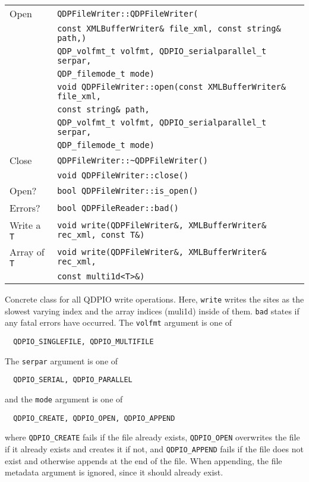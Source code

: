 \documentclass[12pt,letterpaper]{article}
\begin{document}
\begin{flushleft}
  \begin{tabular}{|l|l|}
  \hline
  Open           & \verb|QDPFileWriter::QDPFileWriter(|\\
                 & \qquad\verb|const XMLBufferWriter& file_xml, const string& path,)|\\
                 & \qquad\verb|QDP_volfmt_t volfmt, QDPIO_serialparallel_t serpar,|\\
		 & \qquad\verb|QDP_filemode_t mode)|\\

                 & \verb|void QDPFileWriter::open(const XMLBufferWriter& file_xml, |\\
                 & \qquad\verb|const string& path,|\\
                 & \qquad\verb|QDP_volfmt_t volfmt, QDPIO_serialparallel_t serpar,|\\
		 & \qquad\verb|QDP_filemode_t mode)|\\
  \hline
  Close          & \verb|QDPFileWriter::~QDPFileWriter()|\\
                 & \verb|void QDPFileWriter::close()|\\
  \hline
  Open?          & \verb|bool QDPFileWriter::is_open()| \\
  \hline
  Errors?        & \verb|bool QDPFileReader::bad()| \\
  \hline
  Write a \verb|T| & \verb|void write(QDPFileWriter&, XMLBufferWriter& rec_xml, const T&)| \\
  Array of \verb|T| & \verb|void write(QDPFileWriter&, XMLBufferWriter& rec_xml, |\\
                 & \qquad\verb|const multi1d<T>&)| \\
  \hline
 \end{tabular}
\end{flushleft}
%
Concrete class for all QDPIO write operations. Here, \verb|write|
writes the sites as the slowest varying index and the array indices
(muli1d) inside of them. \verb|bad| states if any fatal errors have
occurred. The \verb|volfmt| argument is one of
%
\begin{verbatim}
  QDPIO_SINGLEFILE, QDPIO_MULTIFILE
\end{verbatim}
%
The \verb|serpar| argument is one of
%
\begin{verbatim}
  QDPIO_SERIAL, QDPIO_PARALLEL
\end{verbatim}
%
and the \verb|mode| argument is one of
%
\begin{verbatim}
  QDPIO_CREATE, QDPIO_OPEN, QDPIO_APPEND
\end{verbatim}
%
where \verb|QDPIO_CREATE| fails if the file already exists,
\verb|QDPIO_OPEN| overwrites the file if it already exists and creates
it if not, and \verb|QDPIO_APPEND| fails if the file does not exist and
otherwise appends at the end of the file.  When appending, the file
metadata argument is ignored, since it should already exist.
\end{document}
